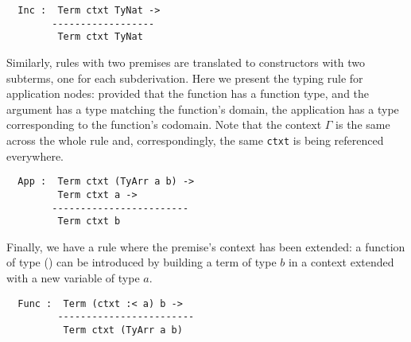 \begin{minipage}{0.45\textwidth}
\inferenceInc
\end{minipage}\hfill
\begin{minipage}{0.45\textwidth}
\begin{Verbatim}
  Inc :  Term ctxt TyNat ->
        ------------------
         Term ctxt TyNat
\end{Verbatim}
\end{minipage}

Similarly, rules with two premises are translated to constructors
with two subterms, one for each subderivation.
%
Here we present the typing rule for application nodes: provided that
the function has a function type, and the argument has a type matching
the function's domain, the application has a type corresponding to the
function's codomain.
Note that the context $\Gamma$ is the same across the whole rule and,
correspondingly, the same \texttt{ctxt} is being referenced everywhere.

\begin{minipage}{0.35\textwidth}
\inferenceApp
\end{minipage}\hfill
\begin{minipage}{0.55\textwidth}
\begin{Verbatim}
  App :  Term ctxt (TyArr a b) ->
         Term ctxt a ->
        ------------------------
         Term ctxt b
\end{Verbatim}
\end{minipage}

Finally, we have a rule where the premise's context has been extended:
a function of type () can be introduced by building a term
of type $b$ in a context extended with a new variable of type $a$.

\begin{minipage}{0.35\textwidth}
\inferenceFunc
\end{minipage}\hfill
\begin{minipage}{0.55\textwidth}
\begin{Verbatim}
  Func :  Term (ctxt :< a) b ->
         ------------------------
          Term ctxt (TyArr a b)
\end{Verbatim}
\end{minipage}






